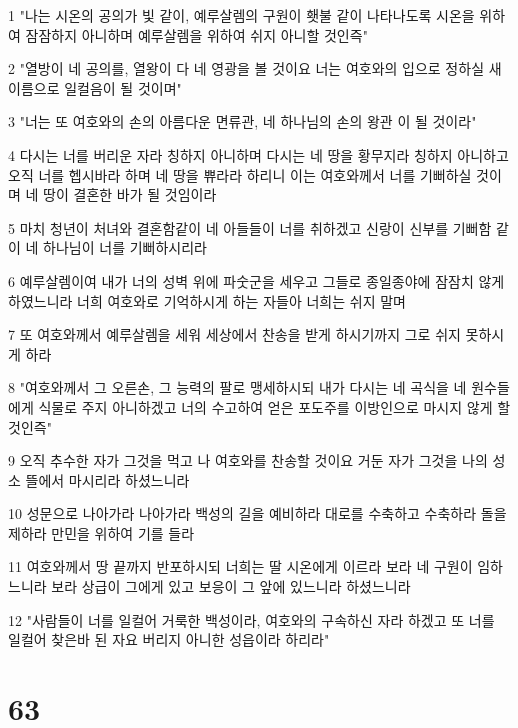 \par 1 "나는 시온의 공의가 빛 같이, 예루살렘의 구원이 횃불 같이 나타나도록 시온을 위하여 잠잠하지 아니하며 예루살렘을 위하여 쉬지 아니할 것인즉"
\par 2 "열방이 네 공의를, 열왕이 다 네 영광을 볼 것이요 너는 여호와의 입으로 정하실 새 이름으로 일컬음이 될 것이며"
\par 3 "너는 또 여호와의 손의 아름다운 면류관, 네 하나님의 손의 왕관 이 될 것이라"
\par 4 다시는 너를 버리운 자라 칭하지 아니하며 다시는 네 땅을 황무지라 칭하지 아니하고 오직 너를 헵시바라 하며 네 땅을 쀼라라 하리니 이는 여호와께서 너를 기뻐하실 것이며 네 땅이 결혼한 바가 될 것임이라
\par 5 마치 청년이 처녀와 결혼함같이 네 아들들이 너를 취하겠고 신랑이 신부를 기뻐함 같이 네 하나님이 너를 기뻐하시리라
\par 6 예루살렘이여 내가 너의 성벽 위에 파숫군을 세우고 그들로 종일종야에 잠잠치 않게 하였느니라 너희 여호와로 기억하시게 하는 자들아 너희는 쉬지 말며
\par 7 또 여호와께서 예루살렘을 세워 세상에서 찬송을 받게 하시기까지 그로 쉬지 못하시게 하라
\par 8 "여호와께서 그 오른손, 그 능력의 팔로 맹세하시되 내가 다시는 네 곡식을 네 원수들에게 식물로 주지 아니하겠고 너의 수고하여 얻은 포도주를 이방인으로 마시지 않게 할 것인즉"
\par 9 오직 추수한 자가 그것을 먹고 나 여호와를 찬송할 것이요 거둔 자가 그것을 나의 성소 뜰에서 마시리라 하셨느니라
\par 10 성문으로 나아가라 나아가라 백성의 길을 예비하라 대로를 수축하고 수축하라 돌을 제하라 만민을 위하여 기를 들라
\par 11 여호와께서 땅 끝까지 반포하시되 너희는 딸 시온에게 이르라 보라 네 구원이 임하느니라 보라 상급이 그에게 있고 보응이 그 앞에 있느니라 하셨느니라
\par 12 "사람들이 너를 일컬어 거룩한 백성이라, 여호와의 구속하신 자라 하겠고 또 너를 일컬어 찾은바 된 자요 버리지 아니한 성읍이라 하리라"

\chapter{63}

